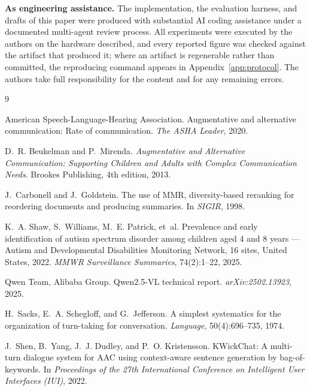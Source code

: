 \textbf{As engineering assistance.} The implementation, the evaluation harness,
and drafts of this paper were produced with substantial AI coding assistance
under a documented multi-agent review process. All experiments were executed by
the authors on the hardware described, and every reported figure was checked
against the artifact that produced it; where an artifact is regenerable rather
than committed, the reproducing command appears in Appendix~\ref{app:protocol}.
The authors take full responsibility for the content and for any remaining
errors.

\begin{thebibliography}{9}

American Speech-Language-Hearing Association.
\newblock Augmentative and alternative communication: Rate of communication.
\newblock \emph{The ASHA Leader}, 2020.

D.~R. Beukelman and P.~Mirenda.
\newblock \emph{Augmentative and Alternative Communication: Supporting Children
and Adults with Complex Communication Needs}.
\newblock Brookes Publishing, 4th edition, 2013.

J.~Carbonell and J.~Goldstein.
\newblock The use of MMR, diversity-based reranking for reordering documents and
producing summaries.
\newblock In \emph{SIGIR}, 1998.

K.~A. Shaw, S.~Williams, M.~E. Patrick, et~al.
\newblock Prevalence and early identification of autism spectrum disorder among
children aged 4 and 8 years --- Autism and Developmental Disabilities Monitoring
Network, 16 sites, United States, 2022.
\newblock \emph{MMWR Surveillance Summaries}, 74(2):1--22, 2025.

Qwen Team, Alibaba Group.
\newblock Qwen2.5-VL technical report.
\newblock \emph{arXiv:2502.13923}, 2025.

H.~Sacks, E.~A. Schegloff, and G.~Jefferson.
\newblock A simplest systematics for the organization of turn-taking for
conversation.
\newblock \emph{Language}, 50(4):696--735, 1974.

J.~Shen, B.~Yang, J.~J. Dudley, and P.~O. Kristensson.
\newblock KWickChat: A multi-turn dialogue system for AAC using context-aware
sentence generation by bag-of-keywords.
\newblock In \emph{Proceedings of the 27th International Conference on
Intelligent User Interfaces (IUI)}, 2022.


\end{thebibliography}
